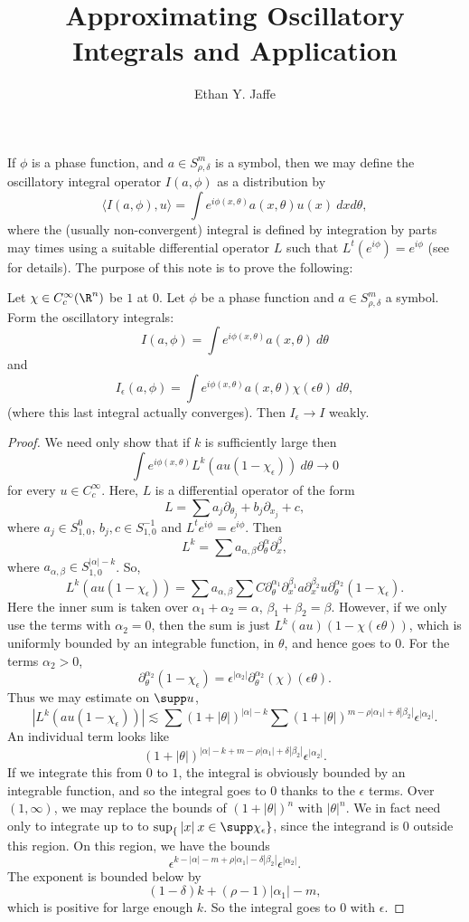 \documentclass[12pt]{article}
\title{Approximating Oscillatory Integrals and Application}
\author{Ethan Y. Jaffe}
\date{}
\begin{document}
\maketitle
If $\phi$ is a phase function, and $a \in S^m_{\rho,\delta}$ is a symbol, then we may define the oscillatory integral operator $I(a,\phi)$ as a distribution by
\[\langle I(a,\phi),u\rangle = \int e^{i\phi(x,\theta)}a(x,\theta)u(x)\ dxd\theta,\]
where the (usually non-convergent) integral is defined by integration by parts may times using a suitable differential operator $L$ such that $L^t(e^{i\phi}) = e^{i\phi}$ (see \cite[Theorem~1.1]{GS} for details). The purpose of this note is to prove the following:
\setcounter{section}{1}
\begin{prop} Let $\chi \in C_c^\infty(\R^n)$ be $1$ at $0$. Let $\phi$ be a phase function and $a \in S^{m}_{\rho,\delta}$ a symbol. Form the oscillatory integrals:
\[I(a,\phi) = \int e^{i\phi(x,\theta)}a(x,\theta)\ d\theta\]
and
\[I_\epsilon(a,\phi) = \int e^{i\phi(x,\theta)}a(x,\theta)\chi(\epsilon \theta)\ d\theta,\]
(where this last integral actually converges). Then $I_\epsilon \to I$ weakly.\end{prop}
\begin{proof}
We need only show that if $k$ is sufficiently large then
\[\int e^{i\phi(x,\theta)}L^k(au(1-\chi_\epsilon))\ d\theta \to 0\] for every $u \in C_c^\infty$. Here, $L$ is a differential operator of the form
\[L = \sum a_j\partial_{\theta_j} + b_j\partial_{x_j} + c,\]
where $a_j \in S^0_{1,0}$, $b_j,c \in S^{-1}_{1,0}$ and $L^t e^{i\phi} = e^{i\phi}$. Then
\[L^k = \sum a_{\alpha,\beta}\partial_{\theta}^\alpha\partial_{x}^\beta,\] where $a_{\alpha,\beta} \in S^{|\alpha|-k}_{1,0}$. So,
\[L^k(au(1-\chi_\epsilon)) = \sum a_{\alpha,\beta}\sum C\partial_{\theta}^{\alpha_1}\partial_{x}^{\beta_1}a\partial_x^{\beta_2}u\partial_{\theta}^{\alpha_2}(1-\chi_\epsilon).\]
Here the inner sum is taken over $\alpha_1+\alpha_2 = \alpha$, $\beta_1+\beta_2 = \beta$. However, if we only use the terms with $\alpha_2 = 0$, then the sum is just $L^k(au)(1-\chi(\epsilon\theta))$, which is uniformly bounded by an integrable function, in $\theta$, and hence goes to $0$. For the terms $\alpha_2 > 0$, \[\partial_{\theta}^{\alpha_2}(1-\chi_\epsilon) = \epsilon^{|\alpha_2|}\partial_{\theta}^{\alpha_2}(\chi)(\epsilon\theta).\] Thus we may estimate on $\supp u$,
\[|L^k(au(1-\chi_\epsilon))| \lesssim \sum (1+|\theta|)^{|\alpha|-k}\sum(1+|\theta|)^{m-\rho|\alpha_1|+\delta|\beta_2|}\epsilon^{|\alpha_2|}.\]
An individual term looks like
\[(1+|\theta|)^{|\alpha|-k+m-\rho|\alpha_1|+\delta|\beta_2|}\epsilon^{|\alpha_2|}.\] If we integrate this from $0$ to $1$, the integral is obviously bounded by an integrable function, and so the integral goes to $0$ thanks to the $\epsilon$ terms. Over $(1,\infty)$, we may replace the bounds of $(1+|\theta|)^n$ with $|\theta|^n$. We in fact need only to integrate up to to $\sup_\{|x| \: x \in \supp \chi_\epsilon\}$, since the integrand is $0$ outside this region. On this region, we have the bounds
\[\epsilon^{k-|\alpha|-m+\rho|\alpha_1|-\delta|\beta_2|}\epsilon^{|\alpha_2|}.\]
The exponent is bounded below by
\[(1-\delta)k+(\rho-1)|\alpha_1|-m,\] which is positive for large enough $k$. So the integral goes to $0$ with $\epsilon$.
\end{proof}
\end{document}
